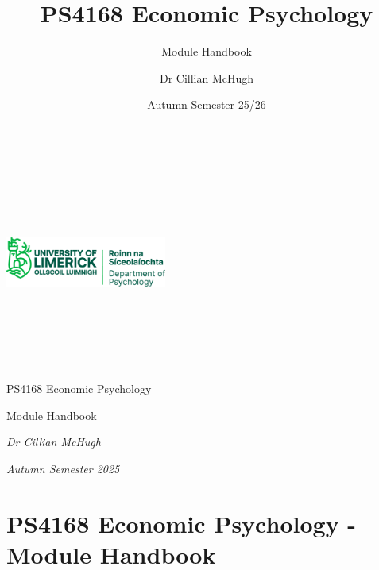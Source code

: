 \documentclass[
  x11names]{article}
\title{PS4168 Economic Psychology}
\subtitle{Module Handbook}
\author{Dr Cillian McHugh}
\date{Autumn Semester 25/26}
\begin{document}
\maketitle

\fancyhead{}
\fancyfoot{}
\fancyhead[LE,RO]{\thepage} 

~

~

~

\centering\includegraphics[width=2.08333in,height=\textheight,keepaspectratio]{"logos/department_logo.PNG"}

\raggedright

~

~

~

\renewcommand{\arraystretch}{1.5}

\begin{center}


\bigskip


\bigskip

\begin{huge} PS4168 Economic Psychology
\end{huge}

\begin{large} Module Handbook

\textit{Dr Cillian McHugh}

\textit{Autumn Semester 2025}
\end{large}
\end{center}

\pagebreak

\section{PS4168 Economic Psychology - Module
Handbook}\label{ps4168-economic-psychology---module-handbook}
\end{document}
